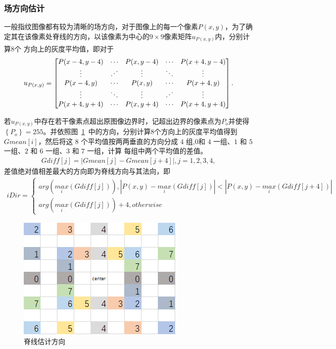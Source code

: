 \documentclass{whutmod}
\newcommand{\udots}{\mathinner{\mskip1mu\raise1pt\vbox{\kern7pt\hbox{.}}  
		\mskip2mu\raise4pt\hbox{.}\mskip2mu\raise7pt\hbox{.}\mskip1mu}}
\newcommand{\upcite}[1]{\textsuperscript{\cite{#1}}}
\begin{document}
\subsubsection{场方向估计}
一般指纹图像都有较为清晰的场方向，对于图像上的每一个像素$P(x,y)$，为了确定其在该像素处脊线的方向，以该像素为中心的$9\times9$像素矩阵$u_{P(x,y)}$内，分别计算$8$个
方向上的灰度平均值\upcite{6}，即对于
\begin{gather*}
	u_{P(x,y)}=\begin{bmatrix}
		P(x-4,y-4) & \cdots  & P(x,y-4) & \cdots  & P(x+4,y-4) \\ 
		\vdots & \udots & \vdots  &  \ddots  & \vdots\\ 
		P(x-4,y) & \cdots & P(x,y) &\cdots& P(x+4,y)  \\ 
		\vdots & \ddots  & \vdots  &  \udots & \vdots\\ 
		P(x+4,y+4) & \cdots & P(x,y+4) &\cdots& P(x+4,y+4)  
	\end{bmatrix}.
\end{gather*}

若$u_{P(x,y)}$中存在若干像素点超出原图像边界时，记超出边界的像素点为$P_o$并使得$\left \{ P_o \right \}=255$。并依照图~\ref{adf}~中的方向，分别计算$8$个方向上的灰度平均值得到$Gmean[i]$，然后将这 $8$ 个平均值按两两垂直的方向分成 $4$ 组,$0 $和 $4$ 一组、$1$ 和 $5$ 一组、$2$ 和 $6$ 一组、$3$ 和 $7$ 一组，计算
每组中两个平均值的差值。
\begin{gather*}
	Gdiff[j]=\left | Gmean[j]-Gmean[j+4] \right |,j=1,2,3,4,
\end{gather*}
差值绝对值相差最大的方向即为脊线方向与其法向，即
\begin{gather*}
	iDir=\left\{\begin{matrix}arg(\underset{i}{max}(Gdiff[j])),\left | P(x,y)-\underset{i}{max}(Gdiff[j]) \right|<\left | P(x,y)-\underset{i}{max}(Gdiff[j+4]) \right|
		\\ arg(\underset{i}{max}(Gdiff[j]))+4,otherwise
	\end{matrix}\right.
\end{gather*}
\begin{figure}[H]
	\centering
	\includegraphics[width=.5\textwidth]{figures/chou.png}
	\caption{脊线估计方向}\label{adf}
\end{figure}   
\end{document}
